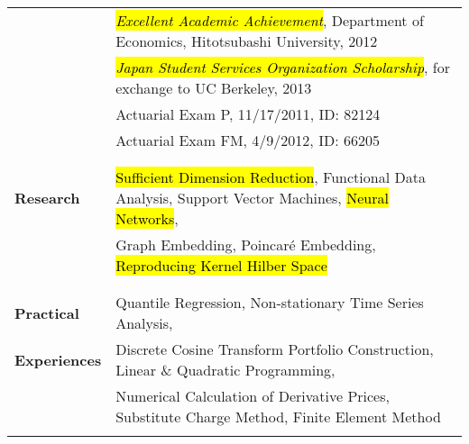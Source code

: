 \documentclass[utf8,letterpaper,oneside]{article}
\begin{document}
\begin{center}
\begin{tabular}{l l}
                           & \hl{\textit{Excellent Academic Achievement}}, Department of Economics, Hitotsubashi University, 2012          \\
  
                           & \hl{\textit{Japan Student Services Organization Scholarship}}, for exchange to UC Berkeley, 2013              \\
                           & Actuarial Exam P, 11/17/2011, ID: 82124                                                                       \\
                           & Actuarial Exam FM, 4/9/2012, ID: 66205                                                                        \\
                           &                                                                                                               \\ \hline
                           &                                                                                                               \\
  \textbf{Research}        & \hl{Sufficient Dimension Reduction}, Functional Data Analysis, Support Vector Machines, \hl{Neural Networks}, \\
                           & Graph Embedding, Poincar\'e Embedding, \hl{Reproducing Kernel Hilber Space}                                   \\
                           &                                                                                                               \\ \hline
                           &                                                                                                               \\
  \textbf{Practical}       & Quantile Regression, Non-stationary Time Series Analysis,                                                     \\
  \textbf{Experiences}     & Discrete Cosine Transform Portfolio Construction, Linear \& Quadratic Programming,                            \\
                           & Numerical Calculation of Derivative Prices, Substitute Charge Method, Finite Element Method                   \\
                           &                                                                                                               \\ \hline

\end{tabular}
\end{center}
\end{document}

